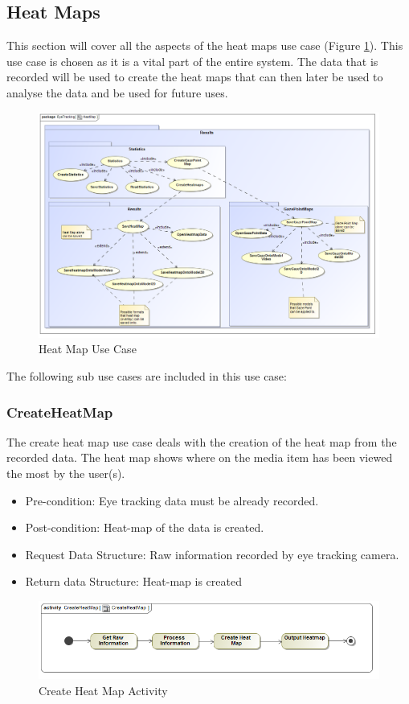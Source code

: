 \subsection{Heat Maps}
	This section will cover all the aspects of the heat maps use case (Figure \ref{HeatMapUseCase}). This use case is chosen as it is a vital part of the entire system. The data that is recorded will be used to create the heat maps that can then later be used to analyse the data and be used for future uses.
	\newline
	\begin{figure}[!ht]
		\centering
		\includegraphics[scale=0.5,width=15cm,keepaspectratio]{Diagrams/Use_Case_Diagram__HeatMap.png}
		\caption{Heat Map Use Case}
		\label{HeatMapUseCase}
	\end{figure}
	

	The following sub use cases are included in this use case:
	\subsubsection{CreateHeatMap}
The create heat map use case deals with the creation of the heat map from the recorded data. The heat map shows where on the media item has been viewed the most by the user(s).
	\begin{itemize}
		\item Pre-condition: Eye tracking data must be already recorded.
		\item Post-condition: Heat-map of the data is created.
		\item Request Data Structure: Raw information recorded by eye tracking camera.
		\item Return data Structure: Heat-map is created
	\end{itemize}
	\begin{figure}[!ht]
		\centering
		\includegraphics[scale=0.05,width=15cm,keepaspectratio]{Diagrams/Activity_Diagram__CreateHeatMap__CreateHeatMap.png}
		\caption{Create Heat Map Activity}
	\end{figure}
	
